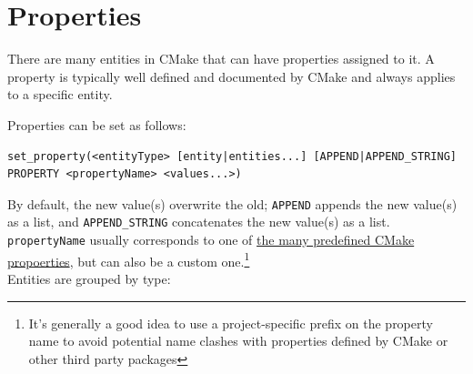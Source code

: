 \documentclass[table, xcdraw]{article}%
\begin{document}
\section{Properties}

There are many entities in CMake that can have properties assigned to it. A property is typically well defined and
documented by CMake and always applies to a specific entity.

Properties can be set as follows:

\begin{verbatim}
set_property(<entityType> [entity|entities...] [APPEND|APPEND_STRING] PROPERTY <propertyName> <values...>)
\end{verbatim}

By default, the new value(s) overwrite the old; \texttt{APPEND} appends the new value(s) as a list, and \texttt{APPEND_STRING} concatenates the new value(s) as a list. \texttt{propertyName} usually corresponds to one of \href{https://cmake.org/cmake/help/latest/manual/cmake-properties.7.html}{the many predefined CMake propoerties}, but can also be a custom one.\footnote{It's generally a good idea to use a project-specific prefix on the property name to avoid potential name clashes with properties defined by CMake or other third party packages}\\
Entities are grouped by type:
\end{document}
